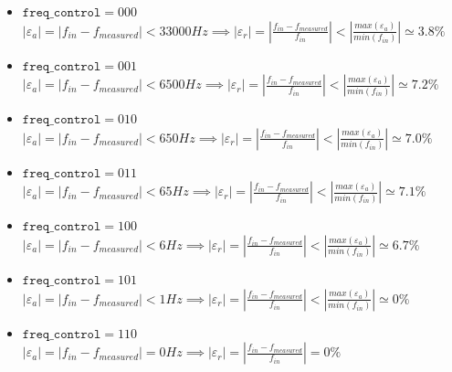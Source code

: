 \begin{itemize}

    \item \(\texttt{freq\_control} = 000\) \\
    \(
        \left|\varepsilon_{a}\right| = \left| f_{in} - f_{measured} \right| < 33000Hz \implies 
        \left|\varepsilon_{r}\right| = \left| \frac{ f_{in} - f_{measured} }{f_{in}} \right| < \left| \frac{ max(\varepsilon_{a}) }{min(f_{in})} \right| \simeq 3.8 \%
    \)
    
    \item \(\texttt{freq\_control} = 001\) \\
    \(
        \left|\varepsilon_{a}\right| = \left| f_{in} - f_{measured} \right| < 6500Hz \implies 
        \left|\varepsilon_{r}\right| = \left| \frac{ f_{in} - f_{measured} }{f_{in}} \right| < \left| \frac{ max(\varepsilon_{a}) }{min(f_{in})} \right| \simeq 7.2 \%
    \)
    
    \item \(\texttt{freq\_control} = 010\) \\
    \(
        \left|\varepsilon_{a}\right| = \left| f_{in} - f_{measured} \right| < 650Hz \implies 
        \left|\varepsilon_{r}\right| = \left| \frac{ f_{in} - f_{measured} }{f_{in}} \right| < \left| \frac{ max(\varepsilon_{a}) }{min(f_{in})} \right| \simeq 7.0 \%
    \)
    
    \item \(\texttt{freq\_control} = 011\) \\
    \(
        \left|\varepsilon_{a}\right| = \left| f_{in} - f_{measured} \right| < 65Hz \implies 
        \left|\varepsilon_{r}\right| = \left| \frac{ f_{in} - f_{measured} }{f_{in}} \right| < \left| \frac{ max(\varepsilon_{a}) }{min(f_{in})} \right| \simeq 7.1 \%
    \)

    \item \(\texttt{freq\_control} = 100\) \\
    \(
        \left|\varepsilon_{a}\right| = \left| f_{in} - f_{measured} \right| < 6Hz \implies 
        \left|\varepsilon_{r}\right| = \left| \frac{ f_{in} - f_{measured} }{f_{in}} \right| < \left| \frac{ max(\varepsilon_{a}) }{min(f_{in})} \right| \simeq 6.7 \%
    \)

    \item \(\texttt{freq\_control} = 101\) \\
    \(
        \left|\varepsilon_{a}\right| = \left| f_{in} - f_{measured} \right| < 1Hz \implies 
        \left|\varepsilon_{r}\right| = \left| \frac{ f_{in} - f_{measured} }{f_{in}} \right| < \left| \frac{ max(\varepsilon_{a}) }{min(f_{in})} \right| \simeq 0 \%
    \)

    \item \(\texttt{freq\_control} = 110\) \\
    \(
        \left|\varepsilon_{a}\right| = \left| f_{in} - f_{measured} \right| = 0Hz \implies 
        \left|\varepsilon_{r}\right| = \left| \frac{ f_{in} - f_{measured} }{f_{in}} \right| = 0\%
    \)
    
\end{itemize}

